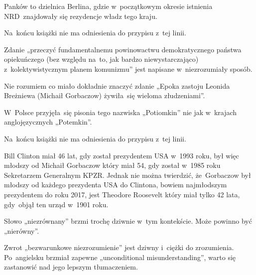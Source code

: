 \documentclass[a4paper,11pt]{article}
\begin{document}
\vspace{\spaceFour}


\start {} Panków to dzielnica Berlina, gdzie
w~początkowym okresie istnienia NRD~znajdowały się rezydencje władz
tego kraju.

\vspace{\spaceFour}


\start {} Na~końcu książki nie ma odniesienia do przypisu
z~tej linii.

\vspace{\spaceFour}


\start {} Zdanie „przeczyć fundamentalnemu
powinowactwu demokratycznego państwa opiekuńczego (bez względu na~to,
jak bardzo niewystarczająco) z~kolektywistycznym planem komunizmu”
jest napisane w~niezrozumiały sposób.

\vspace{\spaceFour}


\start {} Nie rozumiem co miało dokładnie znaczyć
zdanie „Epoka zastoju Leonida Breżniewa (Michaił Gorbaczow)
żywiła~się wieloma złudzeniami”.

\vspace{\spaceFour}

\start {} W~Polsce przyjęła~się pisonia tego nazwiska
„Potiomkin” nie jak w~krajach anglojęzycznych „Potemkin”.

\vspace{\spaceFour}


\start {} Na~końcu książki nie ma odniesienia do przypisu
z~tej linii.

\vspace{\spaceFour}


\start {} Bill Clinton miał 46 lat, gdy został prezydentem USA
w~1993 roku, był więc młodszy od Michaił Gorbaczow który miał 54, gdy
został w~1985 roku Sekretarzem Generalnym KPZR. Jednak nie można
twierdzić, że~Gorbaczow był młodszy od każdego prezydenta USA do
Clintona, bowiem najmłodszym prezydentem do roku 2017, jest Theodore
Roosevelt który miał tylko 42 lata, gdy~objął ten urząd w~1901 roku.

\vspace{\spaceFour}


\start {} Słowo „niezrównany” brzmi trochę dziwnie
w~tym kontekście. Może powinno być „nierówny”.

\vspace{\spaceFour}


\start {} Zwrot „bezwarunkowe niezrozumienie” jest
dziwny i~ciężki do zrozumienia. Po~angielsku brzmiał zapewne
„unconditional misunderstanding”, warto się zastanowić nad jego
lepszym tłumaczeniem.
\end{document}
